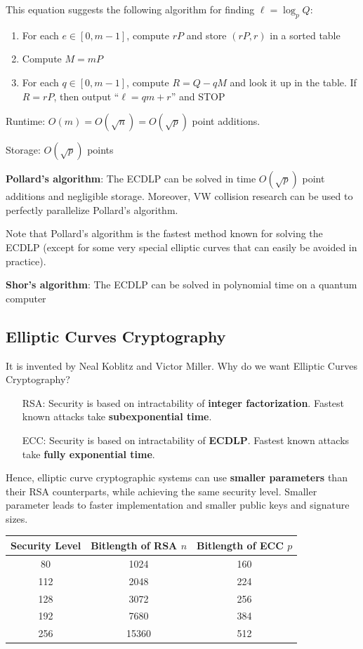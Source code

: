 \documentclass[12pt,titlepage]{article}
\begin{document}
This equation suggests the following algorithm for finding $\ell = \log_p Q$: \begin{enumerate}
	\item For each $e \in [0, m-1]$, compute $rP$ and store $(rP,r)$ in a sorted table
	\item Compute $M = mP$
	\item For each $q \in [0, m-1]$, compute $R = Q-qM$ and look it up in the table. If $R = rP$, then output ``$\ell = qm+r$'' and STOP
\end{enumerate}
Runtime: $O(m) = O(\sqrt{n}) = O(\sqrt{p})$ point additions. 

Storage: $O(\sqrt{p})$ points

\textbf{Pollard's algorithm}: The ECDLP can be solved in time $O(\sqrt{p})$ point additions and negligible storage. Moreover, VW collision research can be used to perfectly parallelize Pollard's algorithm. 

Note that Pollard's algorithm is the fastest method known for solving the ECDLP (except for some very special elliptic curves that can easily be avoided in practice).

\textbf{Shor's algorithm}: The ECDLP can be solved in polynomial time on a quantum computer

\subsection{Elliptic Curves Cryptography}
It is invented by Neal Koblitz and Victor Miller. Why do we want Elliptic Curves Cryptography? \begin{itemize}
	\item [RSA: ] Security is based on intractability of \textbf{integer factorization}. Fastest known attacks take \textbf{subexponential time}. 
	\item [ECC: ] Security is based on intractability of \textbf{ECDLP}. Fastest known attacks take \textbf{fully exponential time}. 
\end{itemize}

Hence, elliptic curve cryptographic systems can use \textbf{smaller parameters} than their RSA counterparts, while achieving the same security level. Smaller parameter leads to faster implementation and smaller public keys and signature sizes. 

\begin{center}
\begin{tabular}{|c|c|c|}
	\hline
	Security Level & Bitlength of RSA $n$ & Bitlength of ECC $p$\\
	\hline
	80 & 1024 & 160\\
	112 & 2048 & 224\\
	128 & 3072 & 256\\
	192 & 7680 & 384\\
	256 & 15360 & 512\\
	\hline
\end{tabular}
\end{center}
\end{document}
